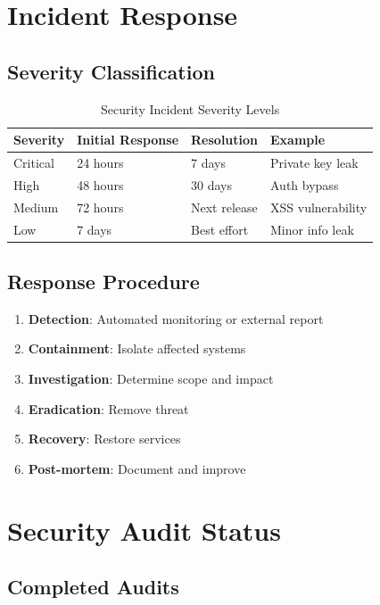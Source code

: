 \section{Incident Response}
\label{sec:incident-response}

\subsection{Severity Classification}

\begin{table}[htbp]
\centering
\caption{Security Incident Severity Levels}
\label{tab:severity}
\begin{tabular}{llll}
\toprule
\textbf{Severity} & \textbf{Initial Response} & \textbf{Resolution} & \textbf{Example} \\
\midrule
Critical & 24 hours & 7 days & Private key leak \\
High & 48 hours & 30 days & Auth bypass \\
Medium & 72 hours & Next release & XSS vulnerability \\
Low & 7 days & Best effort & Minor info leak \\
\bottomrule
\end{tabular}
\end{table}

\subsection{Response Procedure}

\begin{enumerate}
    \item \textbf{Detection}: Automated monitoring or external report
    \item \textbf{Containment}: Isolate affected systems
    \item \textbf{Investigation}: Determine scope and impact
    \item \textbf{Eradication}: Remove threat
    \item \textbf{Recovery}: Restore services
    \item \textbf{Post-mortem}: Document and improve
\end{enumerate}

\section{Security Audit Status}
\label{sec:audit-status}

\subsection{Completed Audits}

